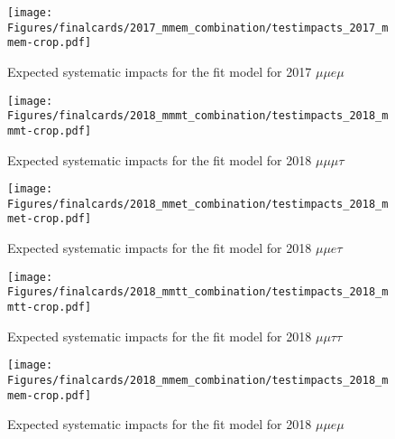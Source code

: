 \begin{figure}[ht!b]
    \centering 
\texttt{[image: Figures/finalcards/2017\_mmem\_combination/testimpacts\_2017\_mmem-crop.pdf]}
    \caption{\label{fig:impacts_2017_mmem} Expected systematic impacts for the fit model for 2017 $\mu\mu e \mu$}
\end{figure}

\begin{figure}[ht!b]
    \centering 
\texttt{[image: Figures/finalcards/2018\_mmmt\_combination/testimpacts\_2018\_mmmt-crop.pdf]}
    \caption{\label{fig:impacts_2018_mmmt} Expected systematic impacts for the fit model for 2018 $\mu\mu\mu\tau$}
\end{figure}

\begin{figure}[ht!b]
    \centering 
\texttt{[image: Figures/finalcards/2018\_mmet\_combination/testimpacts\_2018\_mmet-crop.pdf]}
    \caption{\label{fig:impacts_2018_mmet} Expected systematic impacts for the fit model for 2018 $\mu\mu e \tau$}
\end{figure}

\begin{figure}[ht!b]
    \centering 
\texttt{[image: Figures/finalcards/2018\_mmtt\_combination/testimpacts\_2018\_mmtt-crop.pdf]}
    \caption{\label{fig:impacts_2018_mmtt} Expected systematic impacts for the fit model for 2018 $\mu\mu\tau\tau$}
\end{figure}

\begin{figure}[ht!b]
    \centering 
\texttt{[image: Figures/finalcards/2018\_mmem\_combination/testimpacts\_2018\_mmem-crop.pdf]}
    \caption{\label{fig:impacts_2018_mmem} Expected systematic impacts for the fit model for 2018 $\mu\mu e \mu$}
\end{figure}



